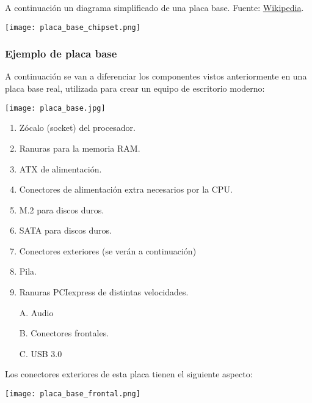 A continuación un diagrama simplificado de una placa base. Fuente: \href{https://es.wikipedia.org/wiki/Placa_base}{Wikipedia}.
\vspace{-10pt}
\begin{center}
    \texttt{[image: placa\_base\_chipset.png]}
\end{center}


\subsubsection{Ejemplo de placa base}

A continuación se van a diferenciar los componentes vistos anteriormente en una placa base real, utilizada para crear un equipo de escritorio moderno:

\begin{center}
    \texttt{[image: placa\_base.jpg]}
\end{center}

\begin{enumerate}
    \item Zócalo (socket) del procesador.
    \item Ranuras para la memoria RAM.
    \item ATX de alimentación.
    \item Conectores de alimentación extra necesarios por la CPU.
    \item M.2 para discos duros.
    \item SATA para discos duros.
    \item Conectores exteriores (se verán a continuación)
    \item Pila.
    \item Ranuras PCIexpress de distintas velocidades.
    \item[A.] Audio
    \item[B.] Conectores frontales.
    \item[C.] USB 3.0
\end{enumerate}

Los conectores exteriores de esta placa tienen el siguiente aspecto:
\begin{center}
    \texttt{[image: placa\_base\_frontal.png]}
\end{center}

